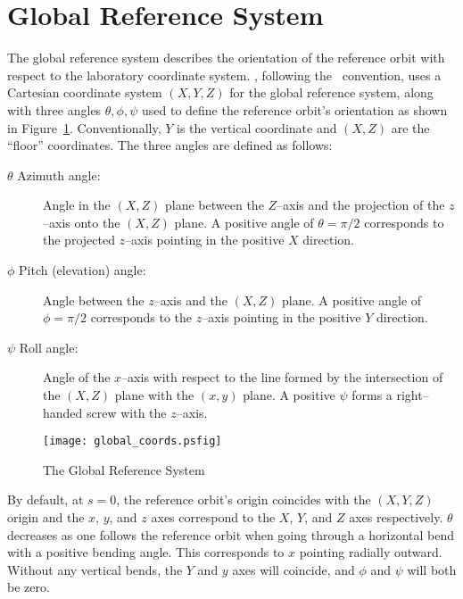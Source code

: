 \section{Global Reference System}
\label{s:global}

The global reference system describes the orientation of the reference
orbit with respect to the laboratory coordinate system.  \bmad,
following the \mad\ convention, uses a Cartesian coordinate system
$(X, Y, Z)$ for the global reference system, along with three angles
$\theta, \phi, \psi$ used to define the reference orbit's orientation
as shown in Figure~\ref{f:global_coords}. Conventionally, $Y$ is the
vertical coordinate and $(X, Z)$ are the ``floor'' coordinates.  The
three angles are defined as follows:
\begin{description}
\item[$\theta$ Azimuth angle:] Angle in the $(X, Z)$ plane 
between the $Z$--axis and the projection of the $z$--axis onto the
$(X, Z)$ plane. A positive angle of $\theta = \pi/2$ corresponds to the
projected $z$--axis pointing in the positive $X$ direction.
\item[$\phi$ Pitch (elevation) angle:] Angle between the $z$--axis 
and the $(X,Z)$ plane. A positive angle of $\phi = \pi/2$ corresponds to
the $z$--axis pointing in the positive $Y$ direction.
\item[$\psi$ Roll angle:] Angle of the $x$--axis with respect 
to the line formed by the
intersection of the $(X, Z)$ plane with the $(x, y)$ plane. A
positive $\psi$ forms a right--handed screw with the $z$--axis.
\end{description}

\begin{figure}
\centering
\texttt{[image: global\_coords.psfig]}
\caption{The Global Reference System}
\label{f:global_coords}
\end{figure}

By default, at $s = 0$,
the reference orbit's origin coincides with the
$(X, Y, Z)$ origin and the $x$, $y$, and $z$ axes
correspond to the $X$, $Y$, and $Z$ axes respectively. $\theta$
decreases as one follows the reference orbit when going through a
horizontal bend with a positive bending angle. This corresponds to $x$
pointing radially outward. Without any vertical bends, the $Y$ and $y$
axes will coincide, and $\phi$ and $\psi$ will both be zero.

\vfill

